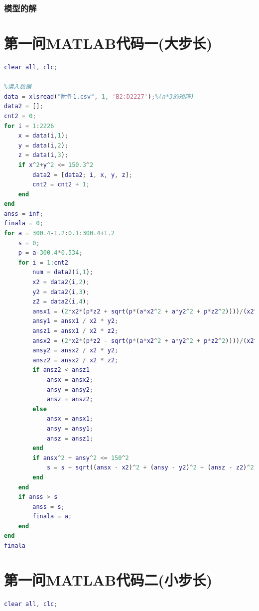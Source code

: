 \documentclass[withoutpreface,bwprint]{cumcmthesis} %
\begin{document}
\subsubsection{模型的解}
\nocite{宋叶志2019}

\begin{appendices}
\section{第一问MATLAB代码一(大步长)}
\begin{lstlisting}[language=matlab]
clear all, clc;

%读入数据
data = xlsread("附件1.csv", 1, 'B2:D2227');%(n*3的矩阵)
data2 = [];
cnt2 = 0;
for i = 1:2226
    x = data(i,1);
    y = data(i,2);
    z = data(i,3);
    if x^2+y^2 <= 150.3^2
        data2 = [data2; i, x, y, z];
        cnt2 = cnt2 + 1;
    end
end
anss = inf;
finala = 0;
for a = 300.4-1.2:0.1:300.4+1.2
    s = 0;
    p = a-300.4*0.534;
    for i = 1:cnt2
        num = data2(i,1);
        x2 = data2(i,2);
        y2 = data2(i,3);
        z2 = data2(i,4);
        ansx1 = (2*x2*(p*z2 + sqrt(p*(a*x2^2 + a*y2^2 + p*z2^2))))/(x2^2 + y2^2); 
        ansy1 = ansx1 / x2 * y2;
        ansz1 = ansx1 / x2 * z2;
        ansx2 = (2*x2*(p*z2 - sqrt(p*(a*x2^2 + a*y2^2 + p*z2^2))))/(x2^2 + y2^2);
        ansy2 = ansx2 / x2 * y2;
        ansz2 = ansx2 / x2 * z2;
        if ansz2 < ansz1
            ansx = ansx2;
            ansy = ansy2;
            ansz = ansz2;
        else
            ansx = ansx1;
            ansy = ansy1;
            ansz = ansz1;
        end
        if ansx^2 + ansy^2 <= 150^2
            s = s + sqrt((ansx - x2)^2 + (ansy - y2)^2 + (ansz - z2)^2);
        end
    end
    if anss > s
        anss = s;
        finala = a;
    end
end
finala

\end{lstlisting}
\section{第一问MATLAB代码二(小步长)}
\begin{lstlisting}[language=matlab]
clear all, clc;


\end{lstlisting}
\end{appendices}
\end{document}
